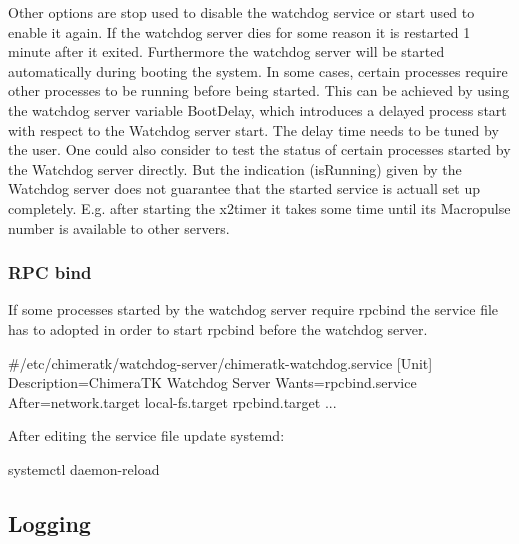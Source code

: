 Other options are {\ttfamily stop} used to disable the watchdog service or {\ttfamily start} used to enable it again. If the watchdog server dies for some reason it is restarted 1 minute after it exited. Furthermore the watchdog server will be started automatically during booting the system. In some cases, certain processes require other processes to be running before being started. This can be achieved by using the watchdog server variable {\ttfamily Boot\+Delay}, which introduces a delayed process start with respect to the Watchdog server start. The delay time needs to be tuned by the user. One could also consider to test the status of certain processes started by the Watchdog server directly. But the indication ({\ttfamily is\+Running}) given by the Watchdog server does not guarantee that the started service is actuall set up completely. E.\+g. after starting the x2timer it takes some time until its Macropulse number is available to other servers.

\subsubsection*{R\+PC bind}

If some processes started by the watchdog server require {\ttfamily rpcbind} the service file has to adopted in order to start {\ttfamily rpcbind} before the watchdog server. \begin{DoxyVerb}#/etc/chimeratk/watchdog-server/chimeratk-watchdog.service
[Unit]
Description=ChimeraTK Watchdog Server
Wants=rpcbind.service
After=network.target local-fs.target rpcbind.target
...
\end{DoxyVerb}


After editing the service file update systemd\+: \begin{DoxyVerb}systemctl daemon-reload
\end{DoxyVerb}


\subsection*{Logging}

